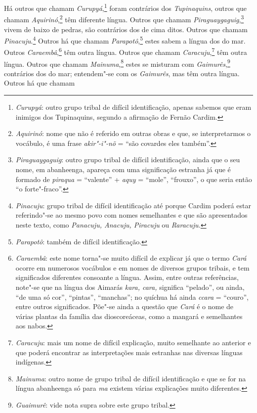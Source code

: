 Há outros que chamam \textit{Curupyá},\footnote{ \textit{Curupyá}: 
outro grupo tribal de difícil identificação, apenas sabemos que eram
inimigos dos Tupinaquins, segundo a afirmação de Fernão Cardim.}
foram contrários dos \textit{Tupinaquins}, outros que chamam
\textit{Aquirinó},\footnote{ \textit{Aquirinó}: nome que não é
referido em outras obras e que, se interpretarmos o vocábulo, é uma frase
\textit{akir"-i"-nõ} = ``são covardes eles também''.} têm
diferente língua. Outros que chamam \textit{Piraguaygaguig},\footnote{ \textit{Piraguaygaguig}: outro grupo tribal de difícil identificação,
ainda que o seu nome, em abanheenga, apareça com uma significação
estranha já que é formado de \textit{piraqua} = ``valente'' +
\textit{aquy} = ``mole'', ``frouxo'', o que seria então ``o
forte"-fraco''.} vivem de baixo de pedras, são contrários dos de
cima ditos. Outros que chamam \textit{Pinacuju}.\footnote{ \textit{Pinacuju}: grupo tribal de difícil identificação até porque
Cardim poderá estar referindo"-se ao mesmo povo com nomes semelhantes e
que são apresentados neste texto, como \textit{Panacuju, Anacuju, 
Piracuju} ou \textit{Raracuju.}} Outros há que chamam
\textit{Parapotô},\footnote{ \textit{Parapotô}: também de difícil
identificação.} estes sabem a língua dos do mar. Outros
\textit{Caraembâ},\footnote{ \textit{Caraembâ}: este nome torna"-se
muito difícil de explicar já que o termo \textit{Cará} ocorre em
numerosos vocábulos e em nomes de diversos grupos tribais, e tem
significados diferentes consoante a língua. Assim, entre outras
referências, note"-se que na língua dos Aimarás \textit{kara, cara,} 
significa ``pelado'', ou ainda, ``de uma só cor'', ``pintas'', ``manchas''; no
quíchua há ainda \textit{ccara} = ``couro'', entre outros significados.
Põe"-se ainda a questão que \textit{Cará} é o nome de várias plantas da
família das dioscoreáceas, como a mangará e semelhantes aos nabos. }
têm outra língua. Outros que chamam 
\textit{Caracuju},\footnote{ \textit{Caracuju}: mais um nome de difícil explicação,
muito semelhante ao anterior e que poderá encontrar as interpretações
mais estranhas nas diversas línguas indígenas.} têm outra
língua. Outros que chamam \textit{Mainuma},\footnote{ \textit{Mainuma}: 
outro nome de grupo tribal de difícil identificação e que se for na
língua abanheenga só para \textit{ma} existem várias explicações muito
diferentes.} estes se misturam com \textit{Gaimurês},\footnote{ \textit{Guaimurê}: 
vide nota supra sobre este grupo tribal.} contrários dos do mar; entendem"-se 
com os \textit{Gaimurês}, mas têm outra língua. Outros há que chamam 
